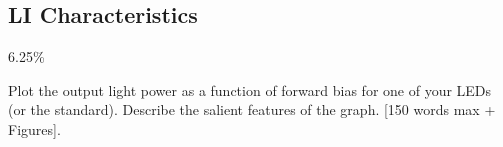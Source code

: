 \subsection{LI Characteristics}
\label{sec:test:li}

6.25\%

Plot the output light power as a function of forward bias for one of your LEDs (or the standard). Describe the salient features of the graph. [150 words max + Figures].
